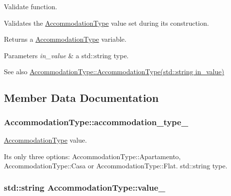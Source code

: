 Validate function. 

Validates the \hyperlink{classAccommodationType}{Accommodation\+Type} value set during its construction.

Returns a \hyperlink{classAccommodationType}{Accommodation\+Type} variable.


\begin{DoxyParams}{Parameters}
{\em in\+\_\+value} & a std\+::string type.\\
\hline
\end{DoxyParams}
\begin{DoxySeeAlso}{See also}
\hyperlink{classAccommodationType_a18d81f6eae122bad2e50f620dae57fed}{Accommodation\+Type\+::\+Accommodation\+Type(std\+::string in\+\_\+value)} 
\end{DoxySeeAlso}


\subsection{Member Data Documentation}
\subsubsection[{\texorpdfstring{accommodation\+\_\+type\+\_\+}{accommodation_type_}}]{ Accommodation\+Type\+::accommodation\+\_\+type\+\_\+\hspace{0.3cm}{\ttfamily [private]}}\hypertarget{classAccommodationType_a56b5a062c43d2dc9e09c04c39bdf5da2}{}\label{classAccommodationType_a56b5a062c43d2dc9e09c04c39bdf5da2}


\hyperlink{classAccommodationType}{Accommodation\+Type} value. 

It\textquotesingle{}s only three options\+: Accommodation\+Type\+::\+Apartamento, Accommodation\+Type\+::\+Casa or Accommodation\+Type\+::\+Flat. std\+::string type. 
\subsubsection[{\texorpdfstring{value\+\_\+}{value_}}]{\setlength{\rightskip}{0pt plus 5cm}std\+::string Accommodation\+Type\+::value\+\_\+\hspace{0.3cm}{\ttfamily [private]}}\hypertarget{classAccommodationType_a7073af2a1cc74b3286bce74851f10283}{}\label{classAccommodationType_a7073af2a1cc74b3286bce74851f10283}


